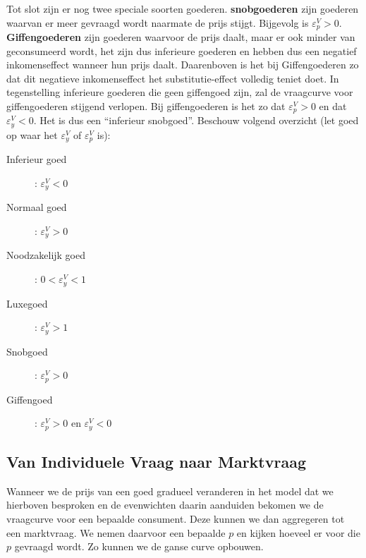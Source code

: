 Tot slot zijn er nog twee speciale soorten goederen. \textbf{snobgoederen} zijn goederen waarvan er meer gevraagd wordt naarmate de prijs stijgt. Bijgevolg is $\varepsilon_{p}^V > 0$. 
\textbf{Giffengoederen} zijn goederen waarvoor de prijs daalt, maar er ook minder van geconsumeerd wordt, het zijn dus inferieure goederen en hebben dus een negatief inkomenseffect wanneer hun prijs daalt. Daarenboven is het bij Giffengoederen zo dat dit negatieve inkomenseffect het substitutie-effect volledig teniet doet. In tegenstelling inferieure goederen die geen giffengoed zijn, zal de vraagcurve voor giffengoederen stijgend verlopen. Bij giffengoederen is het zo dat $\varepsilon_{p}^V > 0$ en dat $\varepsilon_{y}^V < 0$. Het is dus een ``inferieur snobgoed''. Beschouw volgend overzicht (let goed op waar het $\varepsilon_{y}^V$ of $\varepsilon_{p}^V$ is):
\begin{description}
	\item[Inferieur goed]: $\varepsilon_{y}^V < 0$
    \item[Normaal goed]: $\varepsilon_{y}^V > 0$
    \item[Noodzakelijk goed]: $0 < \varepsilon_{y}^V < 1$
    \item[Luxegoed]: $\varepsilon_{y}^V > 1$
    \item[Snobgoed]: $\varepsilon_{p}^V > 0$
    \item[Giffengoed]: $\varepsilon_{p}^V > 0$ en $\varepsilon_{y}^V < 0$
\end{description}


\subsection{Van Individuele Vraag naar Marktvraag}

Wanneer we de prijs van een goed gradueel veranderen in het model dat we hierboven besproken en de evenwichten daarin aanduiden bekomen we de vraagcurve voor een bepaalde consument. Deze kunnen we dan aggregeren tot een marktvraag. We nemen daarvoor een bepaalde $p$ en kijken hoeveel er voor die $p$ gevraagd wordt. Zo kunnen we de ganse curve opbouwen.



